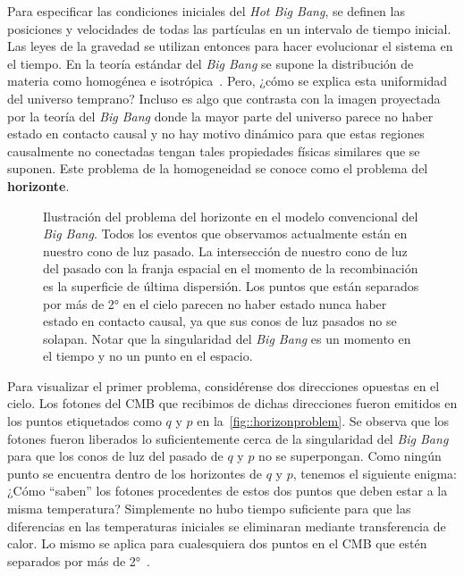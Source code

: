 Para especificar las condiciones iniciales del \textit{Hot Big Bang}, se definen las posiciones y velocidades de todas las partículas en un intervalo de tiempo inicial. Las leyes de la gravedad se utilizan entonces para hacer evolucionar el sistema en el tiempo. En la teoría estándar del \textit{Big Bang} se supone la distribución de materia como homogénea e isotrópica~\cite{baumann2022cosmology}. Pero, ¿cómo se explica esta uniformidad del universo temprano? Incluso es algo que contrasta con la imagen proyectada por la teoría del \textit{Big Bang} donde la mayor parte del universo parece no haber estado en contacto causal y no hay motivo dinámico para que estas regiones causalmente no conectadas tengan tales propiedades físicas similares que se suponen. Este problema de la homogeneidad se conoce como el problema del \textbf{horizonte}.

\begin{figure}
    \centering
    \def\svgwidth{0.75\textwidth}
    
    \caption[Ilustración del problema del horizonte]{Ilustración del problema del horizonte en el modelo convencional del \textit{Big Bang}. Todos los eventos que observamos actualmente están en nuestro cono de luz pasado. La intersección de nuestro cono de luz del pasado con la franja espacial en el momento de la recombinación es la superficie de última dispersión. Los puntos que están separados por más de 2° en el cielo parecen no haber estado nunca haber estado en contacto causal, ya que sus conos de luz pasados no se solapan. Notar que la singularidad del \textit{Big Bang} es un momento en el tiempo y no un punto en el espacio.}
    \label{fig::horizonproblem}
\end{figure}
Para visualizar el primer problema, considérense dos direcciones opuestas en el cielo. Los fotones del CMB que recibimos de dichas direcciones fueron emitidos en los puntos etiquetados como \(q\) y \(p\) en la~\autoref{fig::horizonproblem}. Se observa que los fotones fueron liberados lo suficientemente cerca de la singularidad del \textit{Big Bang} para que los conos de luz del pasado de \(q\) y \(p\) no se superpongan. Como ningún punto se encuentra dentro de los horizontes de \(q\) y \(p\), tenemos el siguiente enigma: ¿Cómo ``saben'' los fotones procedentes de estos dos puntos que deben estar a la misma temperatura? Simplemente no hubo tiempo suficiente para que las diferencias en las temperaturas iniciales se eliminaran mediante transferencia de calor. Lo mismo se aplica para cualesquiera dos puntos en el CMB que estén separados por más de 2°~\cite{baumann2022cosmology}.

